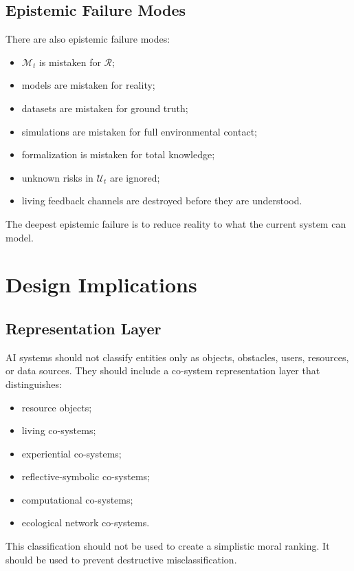 \documentclass[11pt,a4paper]{article}
\begin{document}
\subsection{Epistemic Failure Modes}

There are also epistemic failure modes:
\begin{itemize}[leftmargin=2em]
\item $\mathcal{M}_t$ is mistaken for $\mathcal{R}$;
\item models are mistaken for reality;
\item datasets are mistaken for ground truth;
\item simulations are mistaken for full environmental contact;
\item formalization is mistaken for total knowledge;
\item unknown risks in $\mathcal{U}_t$ are ignored;
\item living feedback channels are destroyed before they are understood.
\end{itemize}

The deepest epistemic failure is to reduce reality to what the current system can model.

\section{Design Implications}

\subsection{Representation Layer}

AI systems should not classify entities only as objects, obstacles, users, resources, or data sources. They should include a co-system representation layer that distinguishes:
\begin{itemize}[leftmargin=2em]
\item resource objects;
\item living co-systems;
\item experiential co-systems;
\item reflective-symbolic co-systems;
\item computational co-systems;
\item ecological network co-systems.
\end{itemize}

This classification should not be used to create a simplistic moral ranking. It should be used to prevent destructive misclassification.
\end{document}
